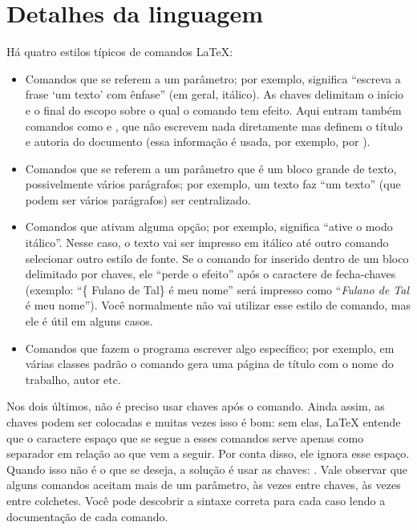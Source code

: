 \section{Detalhes da linguagem}

Há quatro estilos típicos de comandos \LaTeX{}:

\begin{itemize}
\item Comandos que se referem a um parâmetro; por exemplo,
 significa ``escreva a frase
`um texto' com ênfase'' (em geral, itálico). As chaves delimitam o início
e o final do escopo sobre o qual o comando tem efeito. Aqui entram também
comandos como  e ,
que não escrevem nada diretamente mas definem o título e autoria do documento
(essa informação é usada, por exemplo, por ).

\item Comandos que se referem a um parâmetro que é um bloco grande de
texto, possivelmente vários parágrafos; por exemplo, 
um texto  faz ``um texto'' (que podem ser vários
parágrafos) ser centralizado.

\item Comandos que ativam alguma opção; por exemplo, 
significa ``ative o modo itálico''. Nesse caso, o texto vai ser impresso
em itálico até outro comando selecionar outro estilo de fonte. Se o comando
for inserido dentro de um bloco delimitado por chaves, ele ``perde o
efeito'' após o caractere de fecha-chaves (exemplo: ``\{
Fulano de Tal\} é meu nome'' será impresso como ``\textit{Fulano de Tal} é
meu nome''). Você normalmente não vai utilizar esse estilo de comando, mas
ele é útil em alguns casos.

\item Comandos que fazem o programa escrever algo específico; por exemplo,
em várias classes padrão o comando  gera
uma página de título com o nome do trabalho, autor etc.
\end{itemize}

Nos dois últimos, não é preciso usar chaves após o comando. Ainda assim, as
chaves podem ser colocadas e muitas vezes isso é bom: sem elas, \LaTeX{}
entende que o caractere espaço que se segue a esses comandos serve apenas
como separador em relação ao que vem a seguir. Por conta disso, ele ignora
esse espaço. Quando isso não é o que se deseja, a solução é usar as chaves:
.
Vale observar que alguns comandos aceitam mais de um parâmetro, às vezes
entre chaves, às vezes entre colchetes. Você pode descobrir a sintaxe
correta para cada caso lendo a documentação de cada comando.

